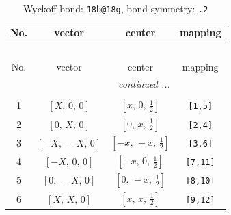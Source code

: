 \documentclass[fleqn,8pt]{jsarticle}
\begin{document}
\begin{longtable}{cccc}
\caption{Wyckoff bond: {\tt 18b@18g}, bond symmetry: {\tt .2}}
 \\
 \hline \hline
No. & vector & center & mapping \\ \hline \endfirsthead

\multicolumn{3}{l}{\tablename\ \thetable{}} \\
 \hline \hline
No. & vector & center & mapping \\ \hline \endhead

 \hline \hline
\multicolumn{3}{r}{\footnotesize\it continued ...} \\ \endfoot

 \hline \hline
\multicolumn{3}{r}{} \\ \endlastfoot

1 & $\left[ X,\, 0,\, 0 \right]$ & $\left[ x,\, 0,\, \frac{1}{2} \right]$ & {\tt [1,5]} \\ \hline
2 & $\left[ 0,\, X,\, 0 \right]$ & $\left[ 0,\, x,\, \frac{1}{2} \right]$ & {\tt [2,4]} \\ \hline
3 & $\left[ - X,\, - X,\, 0 \right]$ & $\left[ - x,\, - x,\, \frac{1}{2} \right]$ & {\tt [3,6]} \\ \hline
4 & $\left[ - X,\, 0,\, 0 \right]$ & $\left[ - x,\, 0,\, \frac{1}{2} \right]$ & {\tt [7,11]} \\ \hline
5 & $\left[ 0,\, - X,\, 0 \right]$ & $\left[ 0,\, - x,\, \frac{1}{2} \right]$ & {\tt [8,10]} \\ \hline
6 & $\left[ X,\, X,\, 0 \right]$ & $\left[ x,\, x,\, \frac{1}{2} \right]$ & {\tt [9,12]} \\
\end{longtable}
\renewcommand{\arraystretch}{1.2}
\end{document}
